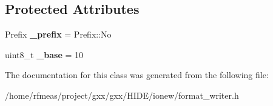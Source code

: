 \subsection*{Protected Attributes}
\begin{DoxyCompactItemize}
\item 
Prefix {\bfseries \+\_\+prefix} = Prefix\+::\+No\hypertarget{classgxx_1_1io_1_1IntegerSpec_a9000bfd6bcdf33e39c90bad0c9768d70}{}\label{classgxx_1_1io_1_1IntegerSpec_a9000bfd6bcdf33e39c90bad0c9768d70}

\item 
uint8\+\_\+t {\bfseries \+\_\+base} = 10\hypertarget{classgxx_1_1io_1_1IntegerSpec_ac2d1942cb2d997dd17877f175c2d63ca}{}\label{classgxx_1_1io_1_1IntegerSpec_ac2d1942cb2d997dd17877f175c2d63ca}

\end{DoxyCompactItemize}


The documentation for this class was generated from the following file\+:\begin{DoxyCompactItemize}
\item 
/home/rfmeas/project/gxx/gxx/\+H\+I\+D\+E/ionew/format\+\_\+writer.\+h\end{DoxyCompactItemize}
